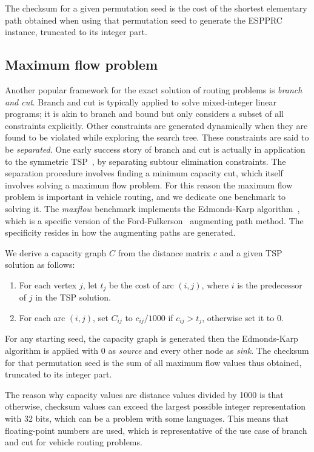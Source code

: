 \documentclass[11pt,a4paper,notitlepage]{article}
\begin{document}
The checksum for a given permutation seed is the cost of the shortest
elementary path obtained when using that permutation seed to generate the
ESPPRC instance, truncated to its integer part.

\subsection{Maximum flow problem}
Another popular framework for the exact solution of routing
problems is \emph{branch and cut}. Branch and cut is typically applied
to solve mixed-integer linear programs; it is akin to branch and bound
but only considers a subset of all constraints explicitly. Other
constraints are generated dynamically when they are found to be
violated while exploring the search tree. These constraints are said
to be \emph{separated}. One early success story of branch and cut is
actually in application to the symmetric TSP~\citep{padberg:532}, by
separating subtour elimination constraints. The separation procedure
involves finding a minimum capacity cut, which itself involves solving
a maximum flow problem. For this reason the maximum flow problem is
important in vehicle routing, and we dedicate one benchmark to solving
it. The \emph{maxflow} benchmark implements the Edmonds-Karp
algorithm~\cite{edmonds-karp}, which is a specific version of the
Ford-Fulkerson~\cite{ford-fulkerson} augmenting path method. The
specificity resides in how the augmenting paths are generated.

We derive a capacity graph $C$ from the distance matrix $c$ and a
given TSP solution as follows: 
\begin{enumerate}
\item For each vertex $j$, let $t_j$ be the cost of arc $(i, j)$,
  where $i$ is the predecessor of $j$ in the TSP solution.
\item For each arc $(i, j)$, set $C_{ij}$ to $c_{ij}/1000$ if $c_{ij}
  > t_j$, otherwise set it to 0.
\end{enumerate}

For any starting seed, the capacity graph is generated then the
Edmonds-Karp algorithm is applied with 0 as \emph{source} and every other
node as \emph{sink}. The checksum for that permutation seed is the sum
of all maximum flow values thus obtained, truncated to its integer part.

The reason why capacity values are distance values divided by 1000 is
that otherwise, checksum values can exceed the largest possible
integer representation with 32 bits, which can be a problem with some
languages. This means that floating-point numbers are used, which is
representative of the use case of branch and cut for vehicle routing problems.
\end{document}
